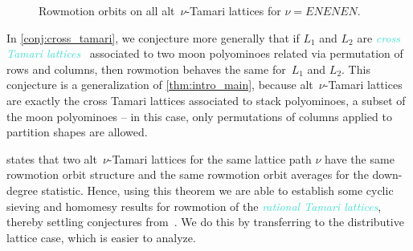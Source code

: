 \documentclass[11pt]{amsart}
\newcounter{width}
\newcommand{\dfn}[1]{\textcolor{Turquoise}{\emph{#1}}}
\theoremstyle{definition}
\begin{document}
\begin{figure}[ht]
\begin{center}

\end{center}
\caption{Rowmotion orbits on all alt~$\nu$-Tamari lattices for $\nu=ENENEN$.}
\label{fig:alt_tamaris_14}
\end{figure}

In \cref{conj:cross_tamari}, we conjecture  more generally that if $L_1$ and $L_2$ are \dfn{cross Tamari lattices}~\cite{vonbell2025framing} associated to two moon polyominoes related via permutation of rows and columns, then rowmotion behaves the same for~$L_1$ and $L_2$. This conjecture is a generalization of \cref{thm:intro_main}, because alt~$\nu$-Tamari lattices are exactly the cross Tamari lattices associated to stack polyominoes, a subset of the moon polyominoes -- in this case, only permutations of columns applied to partition shapes are allowed.

 states that two alt~$\nu$-Tamari lattices for the same lattice path $\nu$ have the same rowmotion orbit structure and the same rowmotion orbit averages for the down-degree statistic. Hence, using this theorem we are able to establish some cyclic sieving and homomesy results for rowmotion of the \dfn{rational Tamari lattices}, thereby settling conjectures from~\cite{defant2024tamari, thomas2019rowmotion}. We do this by transferring to the distributive lattice case, which is easier to analyze.
\end{document}
